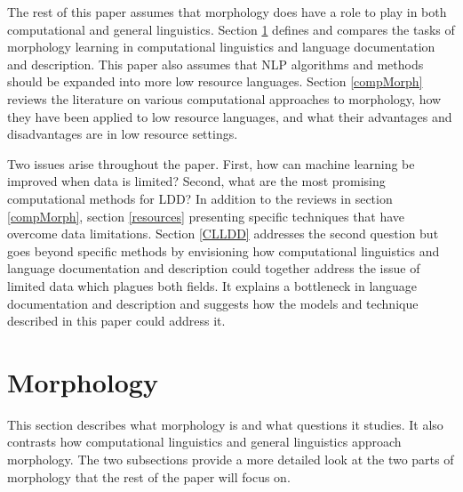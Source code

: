 \documentclass[12pt]{article}
\begin{document}
The rest of this paper assumes that morphology does have a role to play in both computational and general linguistics. Section \ref{tasks} defines and compares the tasks of morphology learning in computational linguistics and language documentation and description. This paper also assumes that NLP algorithms and methods should be expanded into more low resource languages. Section \ref{compMorph} reviews the literature on various computational approaches to morphology, how they have been applied to low resource languages, and what their advantages and disadvantages are in low resource settings.

Two issues arise throughout the paper. First, how can machine learning be improved when data is limited? Second, what are the most promising computational methods for LDD? In addition to the reviews in section \ref{compMorph}, section \ref{resources} presenting specific techniques that have overcome data limitations. Section \ref{CLLDD} addresses the second question but goes beyond specific methods by envisioning how computational linguistics and language documentation and description could together address the issue of limited data which plagues both fields. It explains a bottleneck in language documentation and description and suggests how the models and technique described in this paper could address it.

\section{Morphology}
\label{tasks}

This section describes what morphology is and what questions it studies. It also contrasts how computational linguistics and general linguistics approach morphology. The two subsections provide a more detailed look at the two parts of morphology that the rest of the paper will focus on.
\end{document}

